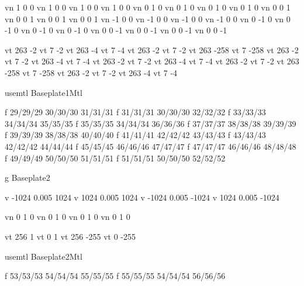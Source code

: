 vn 1 0 0 
vn 1 0 0 
vn 1 0 0 
vn 1 0 0 
vn 0 1 0 
vn 0 1 0 
vn 0 1 0 
vn 0 1 0 
vn 0 0 1 
vn 0 0 1 
vn 0 0 1 
vn 0 0 1 
vn -1 0 0 
vn -1 0 0 
vn -1 0 0 
vn -1 0 0 
vn 0 -1 0 
vn 0 -1 0 
vn 0 -1 0 
vn 0 -1 0 
vn 0 0 -1 
vn 0 0 -1 
vn 0 0 -1 
vn 0 0 -1 

vt 263 -2 
vt 7 -2 
vt 263 -4 
vt 7 -4 
vt 263 -2 
vt 7 -2 
vt 263 -258 
vt 7 -258 
vt 263 -2 
vt 7 -2 
vt 263 -4 
vt 7 -4 
vt 263 -2 
vt 7 -2 
vt 263 -4 
vt 7 -4 
vt 263 -2 
vt 7 -2 
vt 263 -258 
vt 7 -258 
vt 263 -2 
vt 7 -2 
vt 263 -4 
vt 7 -4 

usemtl Baseplate1Mtl

f 29/29/29 30/30/30 31/31/31 
f 31/31/31 30/30/30 32/32/32 
f 33/33/33 34/34/34 35/35/35 
f 35/35/35 34/34/34 36/36/36 
f 37/37/37 38/38/38 39/39/39 
f 39/39/39 38/38/38 40/40/40 
f 41/41/41 42/42/42 43/43/43 
f 43/43/43 42/42/42 44/44/44 
f 45/45/45 46/46/46 47/47/47 
f 47/47/47 46/46/46 48/48/48 
f 49/49/49 50/50/50 51/51/51 
f 51/51/51 50/50/50 52/52/52 

g Baseplate2

v -1024 0.005 1024 
v 1024 0.005 1024 
v -1024 0.005 -1024 
v 1024 0.005 -1024 

vn 0 1 0 
vn 0 1 0 
vn 0 1 0 
vn 0 1 0 

vt 256 1 
vt 0 1 
vt 256 -255 
vt 0 -255 

usemtl Baseplate2Mtl

f 53/53/53 54/54/54 55/55/55 
f 55/55/55 54/54/54 56/56/56 

